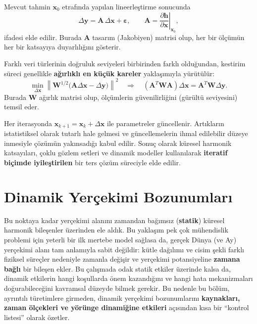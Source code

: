 Mevcut tahmin $\mathbf{x}_0$ etrafında yapılan lineerleştirme sonucunda
\begin{equation}
\Delta\mathbf{y}=\mathbf{A}\,\Delta\mathbf{x}+\boldsymbol{\varepsilon},
\qquad
\mathbf{A}=
\left.\frac{\partial \mathbf{h}}{\partial \mathbf{x}}\right|_{\mathbf{x}_0},
\label{eq:linearized}
\end{equation}
ifadesi elde edilir.
Burada $\mathbf{A}$ tasarım (Jakobiyen) matrisi olup,
her bir ölçümün her bir katsayıya duyarlılığını gösterir.

Farklı veri türlerinin doğruluk seviyeleri birbirinden farklı olduğundan,
kestirim süreci genellikle \textbf{ağırlıklı en küçük kareler} yaklaşımıyla yürütülür:
\begin{equation}
\min_{\Delta\mathbf{x}}
\left\|\mathbf{W}^{1/2}
\big(\mathbf{A}\Delta\mathbf{x}-\Delta\mathbf{y}\big)\right\|^2
\quad\Longrightarrow\quad
(\mathbf{A}^T\mathbf{W}\mathbf{A})\Delta\mathbf{x}
=\mathbf{A}^T\mathbf{W}\Delta\mathbf{y}.
\label{eq:wls_normal_eq}
\end{equation}
Burada $\mathbf{W}$ ağırlık matrisi olup,
ölçümlerin güvenilirliğini (gürültü seviyesini) temsil eder.

Her iterasyonda
$\mathbf{x}_{k+1}=\mathbf{x}_k+\Delta\mathbf{x}$
ile parametreler güncellenir.
Artıkların istatistiksel olarak tutarlı hale gelmesi ve
güncellemelerin ihmal edilebilir düzeye inmesiyle
çözümün yakınsadığı kabul edilir.
Sonuç olarak küresel harmonik katsayıları,
çoklu gözlem setleri ve dinamik modeller kullanılarak
\textbf{iteratif biçimde iyileştirilen}
bir ters çözüm süreciyle elde edilir.


\newpage
\section{Dinamik Yerçekimi Bozunumları}
\label{sec:dynamic_gravity}

Bu noktaya kadar yerçekimi alanını zamandan bağımsız (\textbf{statik}) küresel harmonik bileşenler üzerinden ele aldık.
Bu yaklaşım pek çok mühendislik problemi için yeterli bir ilk mertebe model sağlasa da,
gerçek Dünya (ve Ay) yerçekimi alanı tam anlamıyla sabit değildir:
kütle dağılımı ve cisim şekli farklı fiziksel süreçler nedeniyle zamanla değişir ve
yerçekimi potansiyeline \textbf{zamana bağlı} bir bileşen ekler.
Bu çalışmada odak statik etkiler üzerinde kalsa da, dinamik etkilerin hangi koşullarda önem kazandığını
ve hangi hata mekanizmaları doğurabileceğini kavramsal düzeyde bilmek gerekir.
Bu nedenle bu bölüm, ayrıntılı türetimlere girmeden, dinamik yerçekimi bozunumlarını
\textbf{kaynakları, zaman ölçekleri ve yörünge dinamiğine etkileri} açısından kısa bir ``kontrol listesi'' olarak özetler.

